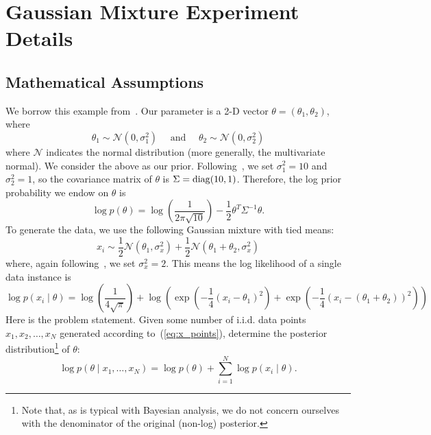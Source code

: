 \documentclass{article}
\begin{document}
\section{Gaussian Mixture Experiment Details}\label{app:gaussian}

\subsection{Mathematical Assumptions}

We borrow this example from~\cite{langevin_2011}. Our parameter is a 2-D vector $\theta =
(\theta_1, \theta_2)$, where
\begin{equation}
\theta_1 \sim \mathcal{N}(0, \sigma_1^2) \quad \mbox{ and } \quad \theta_2 \sim \mathcal{N}(0, \sigma_2^2)
\end{equation}
where $\mathcal{N}$ indicates the normal distribution (more generally, the multivariate normal). We
consider the above as our prior. Following~\cite{langevin_2011}, we set $\sigma_1^2 = 10$ and
$\sigma_2^2=1$, so the covariance matrix of $\theta$ is $\Sigma = {\rm diag}(10,1)$. Therefore, the
log prior probability we endow on $\theta$ is
\begin{equation}
\log p(\theta) = \log \left(\frac{1}{2\pi\sqrt{10}}\right) - \frac{1}{2}\theta^T\Sigma^{-1}\theta.
\end{equation}
To generate the data, we use the following Gaussian mixture with tied means:
\begin{equation}\label{eq:x_points}
x_i \sim \frac{1}{2}\mathcal{N}(\theta_1, \sigma_x^2) + \frac{1}{2}\mathcal{N}(\theta_1+\theta_2, \sigma_x^2)
\end{equation}
where, again following~\cite{langevin_2011}, we set $\sigma_x^2 = 2$. This means the log likelihood
of a single data instance is
\begin{equation}
\log p(x_i \mid \theta) = \log\left(\frac{1}{4\sqrt{\pi}}\right) +
\log\left(\exp\left(-\frac{1}{4}(x_i - \theta_1)^2\right) + \exp\left(-\frac{1}{4}(x_i -
(\theta_1+\theta_2))^2\right)\right)
\end{equation}
Here is the problem statement. Given some number of i.i.d. data points $x_1, x_2, \ldots, x_N$
generated according to~(\ref{eq:x_points}), determine the posterior distribution\footnote{Note that,
as is typical with Bayesian analysis, we do not concern ourselves with the denominator of the
original (non-log) posterior.} of $\theta$:
\begin{equation}\label{eq:log_post}
\log p(\theta \mid x_1,\ldots,x_N) = \log p(\theta) + \sum_{i=1}^N\log p(x_i \mid \theta).
\end{equation}
\end{document}
